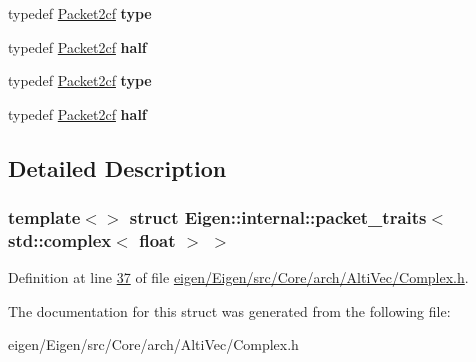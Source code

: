 \begin{DoxyCompactItemize}
typedef \hyperlink{struct_eigen_1_1internal_1_1_packet2cf}{Packet2cf} {\bfseries type}
\item 
\mbox{\label{struct_eigen_1_1internal_1_1packet__traits_3_01std_1_1complex_3_01float_01_4_01_4_a26ca9289181f825939af56a94afc23db}} 
typedef \hyperlink{struct_eigen_1_1internal_1_1_packet2cf}{Packet2cf} {\bfseries half}
\item 
\mbox{\label{struct_eigen_1_1internal_1_1packet__traits_3_01std_1_1complex_3_01float_01_4_01_4_a580a3908d84d95ba19d0c9bddcb40f6a}} 
typedef \hyperlink{struct_eigen_1_1internal_1_1_packet2cf}{Packet2cf} {\bfseries type}
\item 
\mbox{\label{struct_eigen_1_1internal_1_1packet__traits_3_01std_1_1complex_3_01float_01_4_01_4_a26ca9289181f825939af56a94afc23db}} 
typedef \hyperlink{struct_eigen_1_1internal_1_1_packet2cf}{Packet2cf} {\bfseries half}
\end{DoxyCompactItemize}


\subsection{Detailed Description}
\subsubsection*{template$<$$>$\newline
struct Eigen\+::internal\+::packet\+\_\+traits$<$ std\+::complex$<$ float $>$ $>$}



Definition at line \hyperlink{eigen_2_eigen_2src_2_core_2arch_2_alti_vec_2_complex_8h_source_l00037}{37} of file \hyperlink{eigen_2_eigen_2src_2_core_2arch_2_alti_vec_2_complex_8h_source}{eigen/\+Eigen/src/\+Core/arch/\+Alti\+Vec/\+Complex.\+h}.



The documentation for this struct was generated from the following file\+:\begin{DoxyCompactItemize}
\item 
eigen/\+Eigen/src/\+Core/arch/\+Alti\+Vec/\+Complex.\+h\end{DoxyCompactItemize}

